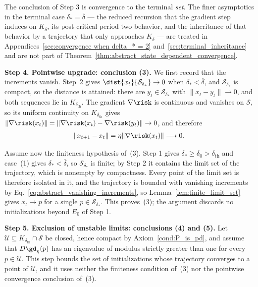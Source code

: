 \documentclass{article}
\begin{document}
The conclusion of Step 3 is convergence to the terminal \emph{set}. 
The finer asymptotics in the terminal case $\delta_\ast=\overline\delta$ ---
the reduced recursion
that the gradient step induces on $K_{\overline\delta}$, its post-critical
period-two behavior, and the inheritance of that behavior by a trajectory that
only approaches $K_{\overline\delta}$ --- are treated in
Appendices~\ref{sec:convergence when delta_* = 2}
and~\ref{sec:terminal_inheritance} and are not part of
Theorem~\ref{thm:abstract_state_dependent_convergence}.

\textbf{Step 4. Pointwise upgrade: conclusion (3).}
We first record that the increments vanish. Step~2 gives
$\dist{x_t}{\mathcal S_{\delta_\ast}}\to0$ when
$\delta_\ast<\overline\delta$, and $\mathcal S_{\delta_\ast}$ is compact, so
the distance is attained: there are $y_t\in\mathcal S_{\delta_\ast}$ with
$\|x_t-y_t\|\to0$, and both sequences lie in $K_{\delta_{\mathrm{th}}}$. The
gradient $\nabla\risk$ is continuous and vanishes on $\mathcal S$, so its
uniform continuity on $K_{\delta_{\mathrm{th}}}$ gives
$\|\nabla\risk(x_t)\|=\|\nabla\risk(x_t)-\nabla\risk(y_t)\|\to0$, and
therefore
\begin{align}
    \|x_{t+1}-x_t\|=\eta\|\nabla\risk(x_t)\|\longrightarrow 0 .
    \label{eq:abstract_vanishing_increments}
\end{align}

Assume now the finiteness hypothesis of~(3). Step 1 gives
$\delta_\ast\ge\delta_0>\delta_{\mathrm{th}}$ and case~(1) gives
$\delta_\ast<\overline\delta$, so $\mathcal S_{\delta_\ast}$ is finite; by
Step 2 it contains the limit set of the trajectory, which is nonempty by
compactness. Every point of the limit set is therefore isolated in it, and the
trajectory is bounded with vanishing increments by
Eq.~\eqref{eq:abstract_vanishing_increments}, so
Lemma~\ref{lem:finite_limit_set} gives $x_t\to p$ for a single
$p\in\mathcal S_{\delta_\ast}$. This proves~(3); the argument discards no
initializations beyond $E_0$ of Step 1.

\textbf{Step 5. Exclusion of unstable limits: conclusions (4) and (5).}
Let $\mathcal U\subseteq K_{\delta_{\mathrm{th}}}\cap\mathcal S$ be closed, hence
compact by Axiom~\ref{cond:P_is_pd}, and assume that $D\gd_\eta(p)$ has an eigenvalue of modulus strictly greater than
one for every $p\in\mathcal U$. This step bounds the set of initializations
whose trajectory converges to a point of $\mathcal U$, and it uses neither the
finiteness condition of~(3) nor the pointwise convergence conclusion of~(3).
\end{document}
